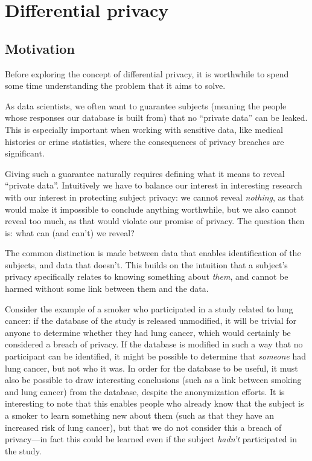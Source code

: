 \section{Differential privacy}

\subsection{Motivation}

Before exploring the concept of differential privacy, it is worthwhile to spend some time understanding the problem that it aims to solve. \bigskip

As data scientists, we often want to guarantee subjects (meaning the people whose responses our database is built from) that no ``private data'' can be leaked. This is especially important when working with sensitive data, like medical histories or crime statistics, where the consequences of privacy breaches are significant.

Giving such a guarantee naturally requires defining what it means to reveal ``private data''. Intuitively we have to balance our interest in interesting research with our interest in protecting subject privacy: we cannot reveal \emph{nothing}, as that would make it impossible to conclude anything worthwhile, but we also cannot reveal too much, as that would violate our promise of privacy. The question then is: what can (and can't) we reveal?

The common distinction is made between data that enables identification of the subjects, and data that doesn't. This builds on the intuition that a subject's privacy specifically relates to knowing something about \emph{them}, and cannot be harmed without some link between them and the data.

Consider the example of a smoker who participated in a study related to lung cancer: if the database of the study is released unmodified, it will be trivial for anyone to determine whether they had lung cancer, which would certainly be considered a breach of privacy. If the database is modified in such a way that no participant can be identified, it might be possible to determine that \emph{someone} had lung cancer, but not who it was. In order for the database to be useful, it must also be possible to draw interesting conclusions (such as a link between smoking and lung cancer) from the database, despite the anonymization efforts. It is interesting to note that this enables people who already know that the subject is a smoker to learn something new about them (such as that they have an increased risk of lung cancer), but that we do not consider this a breach of privacy---in fact this could be learned even if the subject \emph{hadn't} participated in the study.  \bigskip

